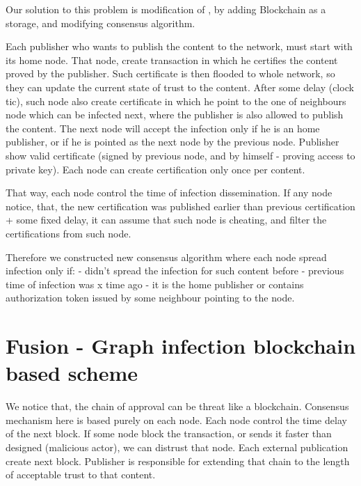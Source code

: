 \documentclass[nostrict]{szablonPG}
\begin{document}
Our solution to this problem is modification of \cite{jekon2019content}, by adding Blockchain as a storage, and modifying consensus algorithm.

Each publisher who wants to publish the content to the network, must start with its home node. That node, create transaction in which he certifies the content proved by the publisher. Such certificate is then flooded to whole network, so they can update the current state of trust to the content. After some delay (clock tic), such node also create certificate in which he point to the one of neighbours node which can be infected next, where the publisher is also allowed to publish the content. The next node will accept the infection only if he is an home publisher, or if he is pointed as the next node by the previous node. Publisher show valid certificate (signed by previous node, and by himself - proving access to private key). Each node can create certification only once per content. 

That way, each node control the time of infection dissemination. If any node notice, that, the new certification was published earlier than previous certification + some fixed delay, it can assume that such node is cheating, and filter the certifications from such node.

Therefore we constructed new consensus algorithm where each node spread infection only if:
- didn't spread the infection for such content before
- previous time of infection was x time ago
- it is the home publisher or contains authorization token issued by some neighbour pointing to the node.

\section{Fusion - Graph infection blockchain based scheme}
We notice that, the chain of approval can be threat like a blockchain. Consensus mechanism here is based purely on each node. Each node control the time delay of the next block. If some node block the transaction, or sends it faster than designed (malicious actor), we can distrust that node. Each external publication create next block. Publisher is responsible for extending that chain to the length of acceptable trust to that content.
\end{document}
